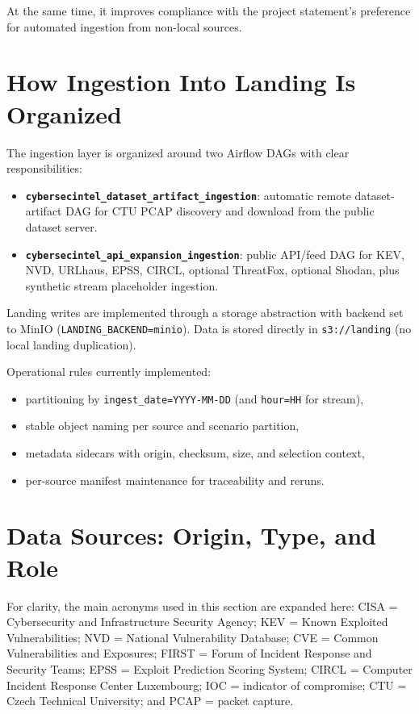 \documentclass[11pt,a4paper]{article}
\begin{document}
At the same time, it improves compliance with the project statement's preference for automated ingestion from non-local sources.

\section{How Ingestion Into Landing Is Organized}
The ingestion layer is organized around two Airflow DAGs with clear responsibilities:
\begin{itemize}[leftmargin=1.5em]
  \item \textbf{\texttt{cybersecintel\_dataset\_artifact\_ingestion}}: automatic remote dataset-artifact DAG for CTU PCAP discovery and download from the public dataset server.
  \item \textbf{\texttt{cybersecintel\_api\_expansion\_ingestion}}: public API/feed DAG for KEV, NVD, URLhaus, EPSS, CIRCL, optional ThreatFox, optional Shodan, plus synthetic stream placeholder ingestion.
\end{itemize}

Landing writes are implemented through a storage abstraction with backend set to MinIO (\texttt{LANDING\_BACKEND=minio}).
Data is stored directly in \texttt{s3://landing} (no local landing duplication).

Operational rules currently implemented:
\begin{itemize}[leftmargin=1.5em]
  \item partitioning by \texttt{ingest\_date=YYYY-MM-DD} (and \texttt{hour=HH} for stream),
  \item stable object naming per source and scenario partition,
  \item metadata sidecars with origin, checksum, size, and selection context,
  \item per-source manifest maintenance for traceability and reruns.
\end{itemize}

\section{Data Sources: Origin, Type, and Role}
For clarity, the main acronyms used in this section are expanded here: CISA = Cybersecurity and Infrastructure Security Agency; KEV = Known Exploited Vulnerabilities; NVD = National Vulnerability Database; CVE = Common Vulnerabilities and Exposures; FIRST = Forum of Incident Response and Security Teams; EPSS = Exploit Prediction Scoring System; CIRCL = Computer Incident Response Center Luxembourg; IOC = indicator of compromise; CTU = Czech Technical University; and PCAP = packet capture.
\end{document}
